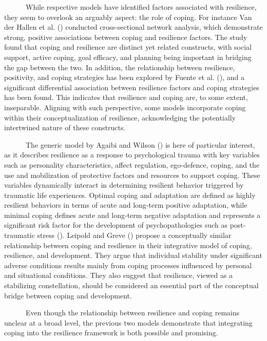 \documentclass[
  man,floatsintext]{apa7}
\begin{document}
~~~~~~While respective models have identified factors associated with resilience, they seem to overlook an arguably aspect: the role of coping. For instance Van der Hallen et al. () conducted cross-sectional network analysis, which demonstrate strong, positive associations between coping and resilience factors. The study found that coping and resilience are distinct yet related constructs, with social support, active coping, goal efficacy, and planning being important in bridging the gap between the two. In addition, the relationship between resilience, positivity, and coping strategies has been explored by Fuente et al. (), and a significant differential association between resilience factors and coping strategies has been found. This indicates that resilience and coping are, to some extent, inseparable. Aligning with such perspective, some models incorporate coping within their conceptualization of resilience, acknowledging the potentially intertwined nature of these constructs.

~~~~~~The generic model by Agaibi and Wilson () is here of particular interest, as it describes resilience as a response to psychological trauma with key variables such as personality characteristics, affect regulation, ego-defence, coping, and the use and mobilization of protective factors and resources to support coping. These variables dynamically interact in determining resilient behavior triggered by traumatic life experiences. Optimal coping and adaptation are defined as highly resilient behaviors in terms of acute and long-term positive adaptation, while minimal coping defines acute and long-term negative adaptation and represents a significant risk factor for the development of psychopathologies such as post-traumatic stress (). Leipold and Greve () propose a conceptually similar relationship between coping and resilience in their integrative model of coping, resilience, and development. They argue that individual stability under significant adverse conditions results mainly from coping processes influenced by personal and situational conditions. They also suggest that resilience, viewed as a stabilizing constellation, should be considered an essential part of the conceptual bridge between coping and development.

~~~~~~Even though the relationship between resilience and coping remains unclear at a broad level, the previous two models demonstrate that integrating coping into the resilience framework is both possible and promising.
\end{document}
